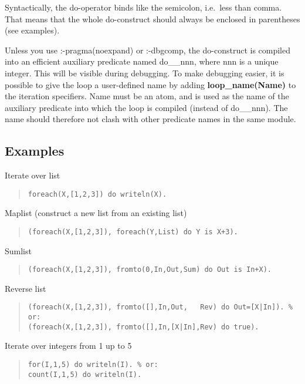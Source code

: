 Syntactically, the do-operator binds like the semicolon, i.e.\ less than comma.
That means that the whole do-construct should always be enclosed in
parentheses (see examples).

Unless you use :-pragma(noexpand) or :-dbgcomp, the do-construct is
compiled into an efficient auxiliary predicate named do__nnn, where
nnn is a unique integer. This will be visible during debugging.
To make debugging easier, it is possible to give the loop a
user-defined name by adding {\bf loop_name(Name)}
to the iteration specifiers.  Name must be an atom, and is used as the
name of the auxiliary predicate into which the loop is compiled
(instead of do__nnn).  The name should therefore not clash with other
predicate names in the same module.



\subsection{Examples}

Iterate over list
\begin{quote}\begin{verbatim}
foreach(X,[1,2,3]) do writeln(X).
\end{verbatim}\end{quote}

Maplist (construct a new list from an existing list)
\begin{quote}\begin{verbatim}
(foreach(X,[1,2,3]), foreach(Y,List) do Y is X+3).
\end{verbatim}\end{quote}

Sumlist
\begin{quote}\begin{verbatim}
(foreach(X,[1,2,3]), fromto(0,In,Out,Sum) do Out is In+X).
\end{verbatim}\end{quote}

Reverse list
\begin{quote}\begin{verbatim}
(foreach(X,[1,2,3]), fromto([],In,Out,   Rev) do Out=[X|In]). % or:
(foreach(X,[1,2,3]), fromto([],In,[X|In],Rev) do true).
\end{verbatim}\end{quote}

Iterate over integers from 1 up to 5
\begin{quote}\begin{verbatim}
for(I,1,5) do writeln(I). % or:
count(I,1,5) do writeln(I).
\end{verbatim}\end{quote}

